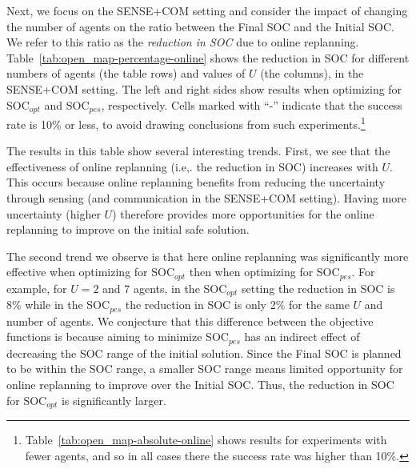 \documentclass[jair,twoside,11pt,theapa]{article}
\newcommand{\sensecom}{SENSE+COM\xspace}
\newcommand{\socopt}{SOC$_{opt}$\xspace}
\newcommand{\socpes}{SOC$_{pes}$\xspace}
\begin{document}
                                                              Next, we focus on the \sensecom setting and consider the impact of changing the number of agents on the ratio between the Final SOC and the Initial SOC. We refer to this ratio as the \emph{reduction in SOC} due to online replanning. 
Table~\ref{tab:open_map-percentage-online} shows the reduction in SOC for different numbers of agents (the table rows) and values of $U$ (the columns), in the \sensecom setting. 
The left and right sides show results when optimizing for \socopt and \socpes, respectively. 
Cells marked with ``-'' indicate that the success rate is {10\%} or less, to avoid drawing conclusions from such experiments.\footnote{Table~\ref{tab:open_map-absolute-online} shows results for experiments with fewer agents, and so in all cases there the success rate was higher than 10\%.} 


The results in this table show several interesting trends. 
First, we see that the effectiveness of online replanning (i.e,. the reduction in SOC) increases with $U$. 
This occurs because online replanning benefits from reducing the uncertainty through sensing (and communication in the \sensecom setting). Having more uncertainty (higher $U$) therefore provides more opportunities for the online replanning to improve on the initial safe solution. 


The second trend we observe is that here online replanning was significantly more effective when optimizing for \socopt then when optimizing for \socpes. 
For example, for $U=2$ and {7} agents, in the \socopt setting the reduction in SOC is {8\%} while in the \socpes the reduction in SOC is only {2\%} for the same $U$ and number of agents. 
We conjecture that this difference between the objective functions is because aiming to minimize \socpes has an indirect effect of decreasing the SOC range of the initial solution. Since the Final SOC is planned to be within the SOC range, a smaller SOC range means limited opportunity for online replanning to improve over the Initial SOC. 
Thus, the reduction in SOC for \socopt is significantly larger. 
\end{document}
